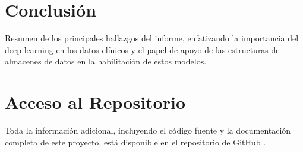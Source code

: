 \documentclass{article}
\begin{document}
\section{Conclusión}
Resumen de los principales hallazgos del informe, enfatizando la importancia del deep learning en los datos clínicos y el papel de apoyo de las estructuras de almacenes de datos en la habilitación de estos modelos.

\newpage
\section{Acceso al Repositorio}

Toda la información adicional, incluyendo el código fuente y la documentación completa de este proyecto, está disponible en el repositorio de GitHub \cite{silva2024github}.

\end{document}
